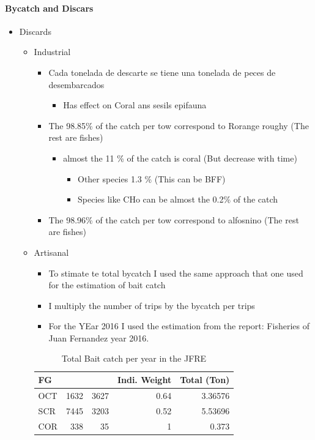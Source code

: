 \documentclass[11pt]{article}
\begin{document}
\paragraph*{Bycatch and Discars}
\label{sec-5-2-2-8}
\begin{itemize}

\item Discards
\label{sec-5-2-2-8-1}%
\begin{itemize}

\item Industrial
\label{sec-5-2-2-8-1-1}%
\begin{itemize}
\item Cada tonelada de descarte se tiene una tonelada de peces de desembarcados \cite{yAñes 2008}
\begin{itemize}
\item Has effect on Coral ans sesils epifauna
\end{itemize}
\item The 98.85\% of the catch per tow correspond to Rorange roughy (The rest are fishes)
\begin{itemize}
\item almost the 11 \% of the catch is coral (But decrease with time) \cite{Anderson2003}
\begin{itemize}
\item Other species 1.3 \% (This can be BFF)
\item Species like CHo can be almost the 0.2\% of the catch
\end{itemize}
\end{itemize}
\item The 98.96\% of the catch per tow correspond to alfosnino (The rest are fishes)
\end{itemize}

\item Artisanal
\label{sec-5-2-2-8-1-2}%
\begin{itemize}
\item To stimate te total bycatch I used the same approach that one used for the estimation of bait catch
\item I multiply the number of trips by the bycatch per trips
\item For the YEar 2016 I used the estimation from the report: Fisheries of Juan Fernandez year 2016.
\end{itemize}
\begin{table}[htb]
\caption{Total Bait catch per year in the JFRE}
\begin{center}
\begin{tabular}{lrrrr}
 FG   &        &        &  Indi. Weight  &  Total (Ton)  \\
\hline
 OCT  &  1632  &  3627  &          0.64  &      3.36576  \\
 SCR  &  7445  &  3203  &          0.52  &      5.53696  \\
 COR  &   338  &    35  &             1  &        0.373  \\
\end{tabular}
\end{center}
\end{table}





\end{itemize}
\end{itemize}
\end{document}
